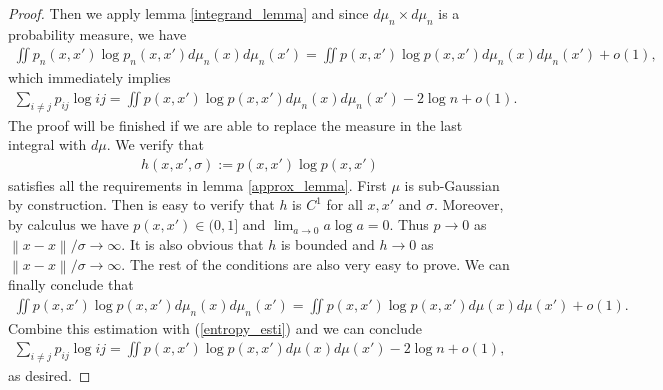 \documentclass[10pt]{article}
\newcommand{\norm}[1]{\left\lVert#1\right\rVert}
\newenvironment{Proof of lemma}{\noindent{\bf Proof of Lemma}}{\hfill$\Box$\newline}
\newenvironment{Proof of claim}{\noindent{\bf Proof of claim}}{\hfill$\Box$\newline}
\newenvironment{Proof of theorem}{\noindent{\bf Proof of Theorem}}{\hfill\scriptsize{$\Box$}\newline}
\newenvironment{Proof of theorems}{\noindent{\bf Proof of Theorems}}{\hfill$\Box$\newline}
\newenvironment{Proof of proposition}{\noindent{\bf Proof of Proposition}}{\hfill$\Box$\newline}
\newenvironment{Proof of propositions}{\noindent{\bf Proof of Propositions}}{\hfill$\Box$\newline}
\newenvironment{Proof of exercise}{\noindent{\it Proof of Exercise:}}{\hfill$\Box$}
\numberwithin{equation}{section}
\begin{document}
\begin{proof}
    Then we apply lemma \ref{integrand_lemma} and since $d \mu_n \times d \mu_n$ is
    a probability measure, we have
    \begin{align}
        \iint p_n(x,x')\log p_n(x,x') d\mu_n(x)d\mu_n(x') = \iint p(x,x')\log p(x,x') d\mu_n(x)d\mu_n(x') +o(1),
    \end{align}
    which immediately implies
    \begin{align} \label{entropy_esti}
        \sum_{i \neq j}p_{ij} \log{ij} = \iint p(x,x')\log p(x,x') d\mu_n(x)d\mu_n(x') -2 \log n + o(1).
    \end{align}
    The proof will be finished if we are able to replace the measure in the last integral with $d \mu$. We verify that
    \begin{align}
        h(x,x',\sigma) :=  p(x,x')\log p(x,x')
    \end{align}
    satisfies all the requirements in lemma \ref{approx_lemma}. First $\mu$ is sub-Gaussian by construction. Then is easy to verify that $h$ is $C^1$ for all $x,x'$ and $\sigma$. Moreover, by calculus we have $p(x,x') \in (0,1]$ and $\lim_{a \to 0} a \log a = 0$. Thus $p \to 0$ as $\norm{x-x}/\sigma \to \infty$. It is also obvious that $h$ is bounded and $h \to 0$ as $\norm{x-x}/\sigma \to \infty$. The rest of the conditions are also very easy to prove. We can finally conclude that
    \begin{align}
        \iint p(x,x')\log p(x,x') d\mu_n(x)d\mu_n(x') = \iint p(x,x')\log p(x,x') d\mu(x)d\mu(x') + o(1).
    \end{align}
    Combine this estimation with (\ref{entropy_esti}) and we can conclude
    \begin{align}
        \sum_{i \neq j}p_{ij} \log{ij} = \iint p(x,x')\log p(x,x') d\mu(x)d\mu(x') - 2\log n + o(1),
    \end{align}
    as desired.
\end{proof}
\end{document}
